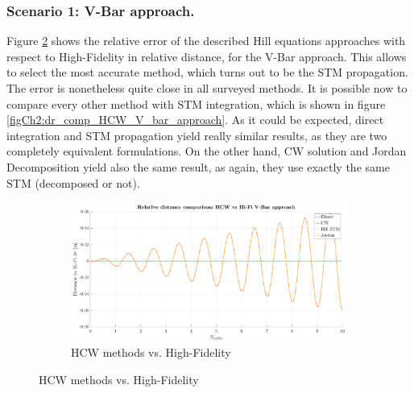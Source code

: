 		\subsubsection{Scenario 1: V-Bar approach. }
		\indent Figure \ref{figCh2:dr_comp_HiFi_V_bar_approach} shows the relative error of the described Hill equations approaches with respect to High-Fidelity in relative distance, for the V-Bar approach. This allows to select the most accurate method, which turns out to be the STM propagation. The error is nonetheless quite close in all surveyed methods. It is possible now to compare every other method with STM integration, which is shown in figure \ref{figCh2:dr_comp_HCW_V_bar_approach}. As it could be expected, direct integration and STM propagation yield really similar results, as they are two completely equivalent formulations. On the other hand, CW solution and Jordan Decomposition yield also the same result, as again, they use exactly the same STM (decomposed or not).
		\begin{figure}[!htb]
		\centering
		\begin{subfigure}[t]{\linewidth}
		\begin{changemargin}{-1.3cm}{-1cm}
		\begin{adjustbox}{width=1.1\textwidth}
		\centering\includegraphics[width = \linewidth]{Chapters/Chapter_02/Low_quality/dr_comp_HiFi_V_bar_approach}
		\end{adjustbox}
		\end{changemargin}
		\caption{HCW methods vs. High-Fidelity}
		\label{figCh2:dr_comp_HiFi_V_bar_approach}
		\end{subfigure}
		\end{figure}
